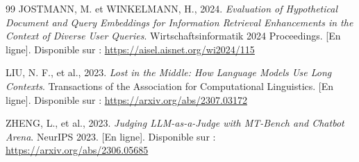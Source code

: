 \begin{thebibliography}{99}
JOSTMANN, M. et WINKELMANN, H., 2024.
\textit{Evaluation of Hypothetical Document and Query Embeddings for Information Retrieval Enhancements in the Context of Diverse User Queries}.
Wirtschaftsinformatik 2024 Proceedings.
[En ligne]. Disponible sur : \url{https://aisel.aisnet.org/wi2024/115}

LIU, N. F., et al., 2023. 
\textit{Lost in the Middle: How Language Models Use Long Contexts}. 
Transactions of the Association for Computational Linguistics. 
[En ligne]. Disponible sur : \url{https://arxiv.org/abs/2307.03172}

ZHENG, L., et al., 2023. 
\textit{Judging LLM-as-a-Judge with MT-Bench and Chatbot Arena}. 
NeurIPS 2023. 
[En ligne]. Disponible sur : \url{https://arxiv.org/abs/2306.05685}

\end{thebibliography}